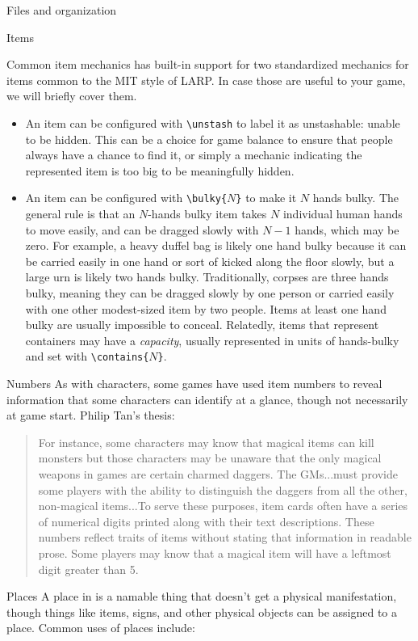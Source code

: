 \documentclass[sheet]{GameTexBase}
\begin{document}
\begin{section}{Files and organization}
\begin{subsection}{Items}
\begin{subsubsection}{Common item mechanics}
\gametex{} has built-in support for two standardized mechanics for items common to the MIT style of LARP.  In case those are useful to your game, we will briefly cover them.
\begin{itemize}
\item An item can be configured with \lstinline|\unstash| to label it as unstashable: unable to be hidden.  This can be a choice for game balance to ensure that people always have a chance to find it, or simply a mechanic indicating the represented item is too big to be meaningfully hidden.
\item An item can be configured with \texttt{\textbackslash{}bulky\{$N$\}} to make it $N$ hands bulky.  The general rule is that an $N$-hands bulky item takes $N$ individual human hands to move easily, and can be dragged slowly with $N-1$ hands, which may be zero.  For example, a heavy duffel bag is likely one hand bulky because it can be carried easily in one hand or sort of kicked along the floor slowly, but a large urn is likely two hands bulky.  Traditionally, corpses are three hands bulky, meaning they can be dragged slowly by one person or carried easily with one other modest-sized item by two people.  Items at least one hand bulky are usually impossible to conceal.  Relatedly, items that represent containers may have a \emph{capacity}, usually represented in units of hands-bulky and set with \texttt{\textbackslash{}contains\{$N$\}}.
\end{itemize}
\end{subsubsection}
\begin{subsubsection}{Numbers}
As with characters, some games have used item numbers to reveal information that some characters can identify at a glance, though not necessarily at game start.  Philip Tan's thesis:
\begin{quote}
For instance, some characters may know that magical items can kill monsters but those
characters may be unaware that the only magical weapons in games are certain charmed
daggers. The GMs...must provide some players with the
ability to distinguish the daggers from all the other, non-magical items...To serve these purposes, item cards often have a series of numerical digits printed along
with their text descriptions. These numbers reflect traits of items without stating that
information in readable prose. Some players may know that a magical item will have a
leftmost digit greater than 5.
\end{quote}
\end{subsubsection}
\end{subsection}
\begin{subsection}{Places}
A place in \gametex{} is a namable thing that doesn't get a physical manifestation, though things like
items, signs, and other physical objects can be assigned to a place.  Common uses of places include:


\end{subsection}
\end{section}
\end{document}
